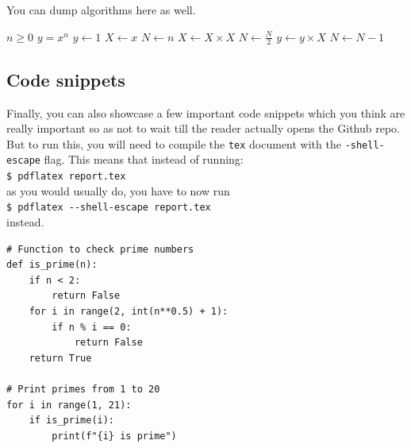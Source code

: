 You can dump algorithms here as well.

\begin{minipage}{0.7\textwidth}
    \begin{algorithm}[H]
        \caption{An algorithm with caption}\label{alg:cap}
        \begin{algorithmic}
        \Require $n \geq 0$
        \Ensure $y = x^n$
            \State $y \gets 1$
            \State $X \gets x$
            \State $N \gets n$
                    \State $X \gets X \times X$
                    \State $N \gets \frac{N}{2}$  
                    \State $y \gets y \times X$
                    \State $N \gets N - 1$
                \EndIf
            \EndWhile
        \end{algorithmic}
    \end{algorithm}
\end{minipage}


\subsection{Code snippets}

Finally, you can also showcase a few important code snippets which you think
are really important so as not to wait till the reader actually opens the
Github repo. But to run this, you will need to compile the \verb|tex| document with
the \verb|-shell-escape| flag. This means that instead of running:\\
\verb|$ pdflatex report.tex|\\
as you would usually do, you have to now run\\
\verb|$ pdflatex --shell-escape report.tex|\\
instead.

\begin{verbatim}
# Function to check prime numbers
def is_prime(n):
    if n < 2:
        return False
    for i in range(2, int(n**0.5) + 1):
        if n % i == 0:
            return False
    return True

# Print primes from 1 to 20
for i in range(1, 21):
    if is_prime(i):
        print(f"{i} is prime")
\end{verbatim}



